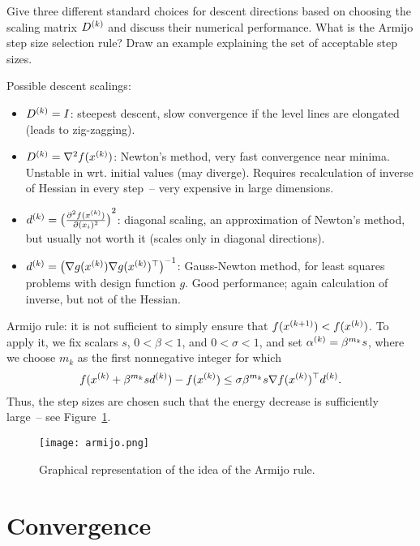 \documentclass{article}
\begin{document}
\begin{question}
  Give three different standard choices for descent directions based on choosing the scaling matrix
  \(\kth{D}\) and discuss their numerical performance. What is the Armijo step size selection
  rule? Draw an example explaining the set of acceptable step sizes.
\end{question}
Possible descent scalings:
\begin{itemize}
\item \(\kth{D} = I\): steepest descent, slow convergence if the level lines are elongated (leads to
  zig-zagging).
\item \(\kth{D} = \nabla^2 f(\kth{x})\): Newton's method, very fast convergence near minima.  Unstable in
  wrt. initial values (may diverge). Requires recalculation of inverse of Hessian in every step~--
  very expensive in large dimensions.
\item \(\kth{d} = \del[1]{\pd[2]{f(\kth{x})}{(x_i)}}^2\): diagonal scaling, an approximation of
  Newton's method, but usually not worth it (scales only in diagonal directions).
\item \(\kth{d} = \del[1]{\nabla g(\kth{x}) \T{\nabla g(\kth{x})}}^{-1}\): Gauss-Newton method, for
  least squares problems with design function \(g\). Good performance; again calculation of inverse,
  but not of the Hessian.
\end{itemize}

Armijo rule: it is not sufficient to simply ensure that \(f(\kth[k+1]{x}) < f(\kth{x})\). To apply
it, we fix scalars \(s\), \(0 < \beta < 1\), and \(0 < \sigma < 1\), and set
\(\kth{\alpha} = \beta^{m_k} s\), where we choose \(m_k\) as the first nonnegative integer for which
\begin{equation*}
  f(\kth{x} + \beta^{m_k} s \kth{d}) - f(\kth{x}) \leq \sigma \beta^{m_k} s \nabla \T{f(\kth{x})} \kth{d}.
\end{equation*}
Thus, the step sizes are chosen such that the energy decrease is sufficiently large~-- see
Figure~\ref{fig:armijo}.
\begin{figure}[H]
  \texttt{[image: armijo.png]}
  \caption{Graphical representation of the idea of the Armijo rule.\label{fig:armijo}}
\end{figure}


\section{Convergence}
\end{document}
